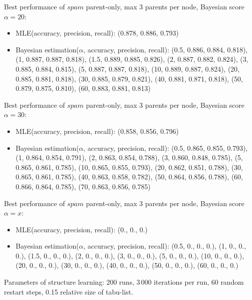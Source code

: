 \documentclass[english,cover]{fitthesis} %
\newcommand{\todo}[1]{{\color{red}#1}}
\begin{document}
{Best performance of $spam$ parent-only, max 3 parents per node, Bayesian score $\alpha=20$:
\begin{itemize}
    \item MLE(accuracy, precision, recall): (0.878, 0.886, 0.793)
    \item Bayesian estimation($\alpha$, accuracy, precision, recall): (0.5, 0.886, 0.884, 0.818), (1, 0.887, 0.887, 0.818), (1.5, 0.889, 0.885, 0.826), (2, 0.887, 0.882, 0.824), (3, 0.885, 0.884, 0.815), (5, 0.887, 0.887, 0.818), (10, 0.889, 0.887, 0.824), (20, 0.885, 0.881, 0.818), (30, 0.885, 0.879, 0.821), (40, 0.881, 0.871, 0.818), (50, 0.879, 0.875, 0.810), (60, 0.883, 0.881, 0.813)
\end{itemize}

Best performance of $spam$ parent-only, max 3 parents per node, Bayesian score $\alpha=30$:
\begin{itemize}
    \item MLE(accuracy, precision, recall): (0.858, 0.856, 0.796)
    \item Bayesian estimation($\alpha$, accuracy, precision, recall): (0.5, 0.865, 0.855, 0.793), (1, 0.864, 0.854, 0.791), (2, 0.863, 0.854, 0.788), (3, 0.860, 0.848, 0.785), (5, 0.865, 0.861, 0.785), (10, 0.865, 0.855, 0.793), (20, 0.862, 0.851, 0.788), (30, 0.865, 0.861, 0.785), (40, 0.863, 0.858, 0.782), (50, 0.864, 0.856, 0.788), (60, 0.866, 0.864, 0.785), (70, 0.863, 0.856, 0.785)
\end{itemize}

Best performance of $spam$ parent-only, max 3 parents per node, Bayesian score $\alpha=x$:
\begin{itemize}
    \item MLE(accuracy, precision, recall): (0., 0., 0.)
    \item Bayesian estimation($\alpha$, accuracy, precision, recall): (0.5, 0., 0., 0.), (1, 0., 0., 0.), (1.5, 0., 0., 0.), (2, 0., 0., 0.), (3, 0., 0., 0.), (5, 0., 0., 0.), (10, 0., 0., 0.), (20, 0., 0., 0.), (30, 0., 0., 0.), (40, 0., 0., 0.), (50, 0., 0., 0.), (60, 0., 0., 0.)
\end{itemize}
}

Parameters of structure learning: 200 runs, 3\,000 iterations per run, 60 random restart steps, 0.15 relative size of tabu-list.

\end{document}
